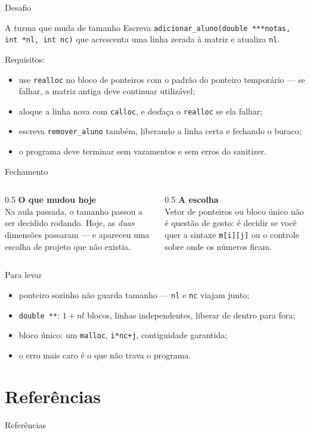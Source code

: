 \documentclass[aspectratio=169]{beamer}
\begin{document}
\begin{frame}{Desafio}
  \begin{block}{A turma que muda de tamanho}
    Escreva \texttt{adicionar\_aluno(double ***notas, int *nl, int nc)} que
    acrescenta uma linha zerada à matriz e atualiza \texttt{nl}.

    \medskip
    Requisitos:
    \begin{itemize}
      \item use \texttt{realloc} no bloco de ponteiros com o padrão do ponteiro
        temporário --- se falhar, a matriz antiga deve continuar utilizável;
      \item aloque a linha nova com \texttt{calloc}, e desfaça o
        \texttt{realloc} se ela falhar;
      \item escreva \texttt{remover\_aluno} também, liberando a linha certa e
        fechando o buraco;
      \item o programa deve terminar sem vazamentos e sem erros do sanitizer.
    \end{itemize}
  \end{block}
\end{frame}

\begin{frame}{Fechamento}
  \begin{columns}[T]
    \begin{column}{0.5\textwidth}
      \textbf{O que mudou hoje}\\[0.3em]
      Na aula passada, o tamanho passou a ser decidido rodando. Hoje, as
      \emph{duas} dimensões passaram --- e apareceu uma escolha de projeto que
      não existia.
    \end{column}
    \begin{column}{0.5\textwidth}
      \textbf{A escolha}\\[0.3em]
      Vetor de ponteiros ou bloco único não é questão de gosto: é decidir se
      você quer a sintaxe \texttt{m[i][j]} ou o controle sobre onde os números
      ficam.
    \end{column}
  \end{columns}
  \begin{block}{Para levar}
    \begin{itemize}
      \item ponteiro sozinho não guarda tamanho --- \texttt{nl} e \texttt{nc}
        viajam junto;
      \item \texttt{double **}: $1+nl$ blocos, linhas independentes, liberar de
        dentro para fora;
      \item bloco único: um \texttt{malloc}, \texttt{i*nc+j}, contiguidade
        garantida;
      \item o erro mais caro é o que não trava o programa.
    \end{itemize}
  \end{block}
\end{frame}

\section*{Referências}
\begin{frame}[allowframebreaks]{Referências}
  \nocite{*}
  
  
\end{frame}
\end{document}
